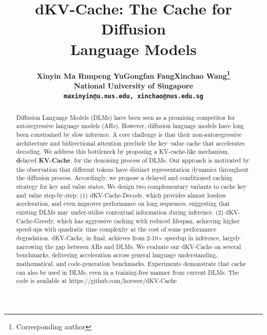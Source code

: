 \documentclass{article}
\title{dKV-Cache: The Cache for Diffusion \\Language Models}
\author{
\bf Xinyin Ma \quad Runpeng Yu\quad Gongfan Fang\quad Xinchao Wang\thanks{Corresponding author}\\
{National University of Singapore} \\
{\tt\small  maxinyin@u.nus.edu, 
xinchao@nus.edu.sg} \\
}
\begin{document}
\maketitle


\begin{abstract}

Diffusion Language Models (DLMs) have been seen as a promising competitor for autoregressive language models (ARs). However, diffusion language models have long been constrained by slow inference. A core challenge is that their non‑autoregressive architecture and bidirectional attention preclude the key–value cache that accelerates decoding. We address this bottleneck by proposing a KV-cache-like mechanism, \textbf{d}elayed \textbf{KV-Cache}, for the denoising process of DLMs. Our approach is motivated by the observation that different tokens have distinct representation dynamics throughout the diffusion process. Accordingly, we propose a delayed and conditioned caching strategy for key and value states.
We design two complementary variants to cache key and value step‑by‑step: 
(1) dKV-Cache-Decode, which provides almost lossless acceleration, and even improves performance on long sequences, suggesting that existing DLMs may under‑utilise contextual information during inference. 
(2) dKV-Cache‑Greedy, which has aggressive caching with reduced lifespan, achieving higher speed-ups with quadratic time complexity at the cost of some performance degradation. 
dKV-Cache, in final, achieves from 2-10$\times$ speedup in inference, largely narrowing the gap between ARs and DLMs.  
We evaluate our dKV-Cache on several benchmarks, delivering acceleration across general language understanding, mathematical, and code‑generation benchmarks. Experiments demonstrate that cache can also be used in DLMs, even in a training-free manner from current DLMs. The code is available at https://github.com/horseee/dKV-Cache

\end{abstract}
\end{document}
